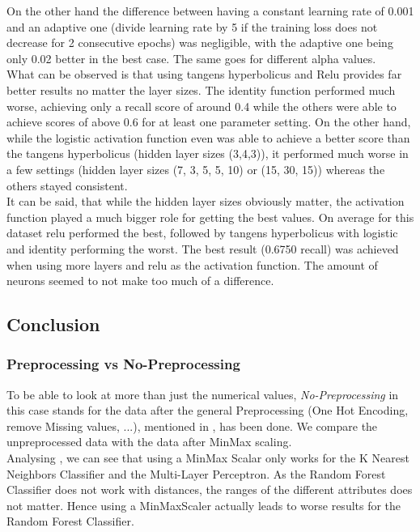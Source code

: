 On the other hand the difference between having a constant learning rate of 0.001 and an adaptive one (divide learning rate by 5 if the training loss does not decrease for 2 consecutive epochs) was negligible, with the adaptive one being only 0.02 better in the best case. The same goes for different alpha values. \\
\newline
What can be observed is that using tangens hyperbolicus and Relu provides far better results no matter the layer sizes. The identity function performed much worse, achieving only a recall score of around 0.4 while the others were able to achieve scores of above 0.6 for at least one parameter setting. On the other hand, while the logistic activation function even was able to achieve a better score than the tangens hyperbolicus (hidden layer sizes (3,4,3)), it performed much worse in a few settings (hidden layer sizes (7, 3, 5, 5, 10) or (15, 30, 15)) whereas the others stayed consistent. \\
\newline
It can be said, that while the hidden layer sizes obviously matter, the activation function played a much bigger role for getting the best values. On average for this dataset relu performed the best, followed by tangens hyperbolicus with logistic and identity performing the worst. The best result (0.6750 recall) was achieved when using more layers and relu as the activation function. The amount of neurons seemed to not make too much of a difference.


\subsection{Conclusion}
\subsubsection{Preprocessing vs No-Preprocessing}
To be able to look at more than just the numerical values, \textit{No-Preprocessing} in this case stands for the data after the general Preprocessing (One Hot Encoding, remove Missing values, ...), mentioned in , has been done. We compare the unpreprocessed data with the data after MinMax scaling.\\%
\newline
Analysing , we can see that using a MinMax Scalar only works for the K Nearest Neighbors Classifier and the Multi-Layer Perceptron. As the Random Forest Classifier does not work with distances,  the ranges of the different attributes does not matter. Hence using a MinMaxScaler actually leads to worse results for the Random Forest Classifier.

